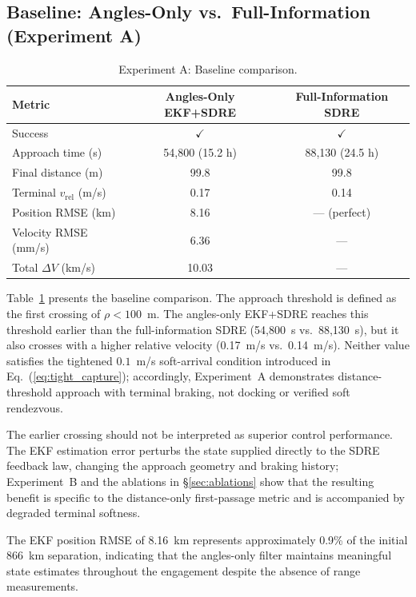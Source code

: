 \documentclass[preprint,3p,times]{elsarticle}
\begin{document}
\subsection{Baseline: Angles-Only vs.\ Full-Information (Experiment A)}

\begin{table}[h]
\centering
\caption{Experiment A: Baseline comparison.}
\label{tab:expA}
\begin{tabular}{lcc}
\toprule
Metric & Angles-Only EKF+SDRE & Full-Information SDRE \\
\midrule
Success & $\checkmark$ & $\checkmark$ \\
Approach time (s) & 54,800 (15.2 h) & 88,130 (24.5 h) \\
Final distance (m) & 99.8 & 99.8 \\
Terminal $v_{\text{rel}}$ (m/s) & 0.17 & 0.14 \\
Position RMSE (km) & 8.16 & --- (perfect) \\
Velocity RMSE (mm/s) & 6.36 & --- \\
Total $\Delta V$ (km/s) & 10.03 & --- \\
\bottomrule
\end{tabular}
\end{table}

Table~\ref{tab:expA} presents the baseline comparison. The approach threshold is defined as the first crossing of $\rho < 100$~m. The angles-only EKF+SDRE reaches this threshold earlier than the full-information SDRE (54,800~s vs.\ 88,130~s), but it also crosses with a higher relative velocity (0.17~m/s vs.\ 0.14~m/s). Neither value satisfies the tightened $0.1$~m/s soft-arrival condition introduced in Eq.~(\ref{eq:tight_capture}); accordingly, Experiment~A demonstrates distance-threshold approach with terminal braking, not docking or verified soft rendezvous.

The earlier crossing should not be interpreted as superior control performance. The EKF estimation error perturbs the state supplied directly to the SDRE feedback law, changing the approach geometry and braking history; Experiment~B and the ablations in §\ref{sec:ablations} show that the resulting benefit is specific to the distance-only first-passage metric and is accompanied by degraded terminal softness.

The EKF position RMSE of 8.16~km represents approximately 0.9\% of the initial 866~km separation, indicating that the angles-only filter maintains meaningful state estimates throughout the engagement despite the absence of range measurements.
\end{document}
